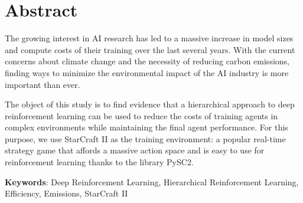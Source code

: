 \chapter*{Abstract}

The growing interest in AI research has led to a massive increase in model sizes and compute costs of their training over the last several years. With the current concerns about climate change and the necessity of reducing carbon emissions, finding ways to minimize the environmental impact of the AI industry is more important than ever.

The object of this study is to find evidence that a hierarchical approach to deep reinforcement learning can be used to reduce the costs of training agents in complex environments while maintaining the final agent performance. For this purpose, we use StarCraft II as the training environment: a popular real-time strategy game that affords a massive action space and is easy to use for reinforcement learning thanks to the library PySC2.

\vspace{1.5cm}

\textbf{Keywords}: Deep Reinforcement Learning, Hierarchical Reinforcement Learning, Efficiency, Emissions, StarCraft II